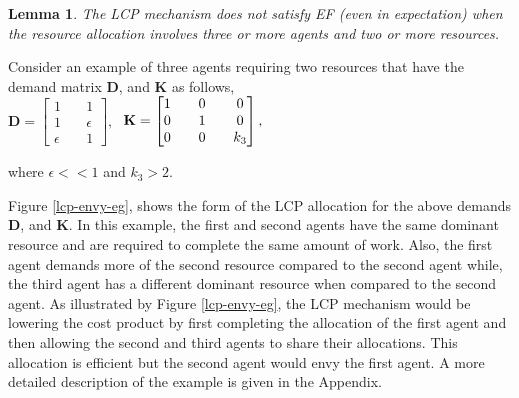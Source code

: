 \documentclass[letterpaper]{article} %
\newtheorem{lemma}{Lemma}
\theoremstyle{definition}
\begin{document}
\begin{lemma} \label{lcp-envy}
The LCP mechanism does not satisfy EF (even in expectation) when the resource allocation involves three or more agents and two or more resources.  
\end{lemma}


Consider an example of three agents requiring two resources that have the demand matrix $\mathbf{D}$, and $\mathbf{K}$ as follows, \\[2 pt]
\noindent $\mathbf{D} = \begin{bmatrix} 1 \quad & 1 \\
1 \quad & \epsilon \\
\epsilon \quad & 1\end{bmatrix} ,\;$ 
\noindent $\mathbf{K} = \begin{bmatrix} 1 \quad & 0 \quad & 0 \\
0 \quad & 1 \quad & 0 \\
0 \quad & 0 \quad & k_{3} \\\end{bmatrix}, \\$ 

\noindent where $\epsilon << 1$ and $k_{3} > 2$. 

Figure \ref{lcp-envy-eg}, shows the form of the LCP allocation for the above demands $\mathbf{D}$, and $\mathbf{K}$. In this example, the first and second agents have the same dominant resource and are required to complete the same amount of work. Also, the first agent demands more of the second resource compared to the second agent while, the third agent has a different dominant resource when compared to the second agent. As illustrated by Figure \ref{lcp-envy-eg}, the LCP mechanism would be lowering the cost product by first completing the allocation of the first agent and then allowing the second and third agents to share their allocations. This allocation is efficient but the second agent would envy the first agent. A more detailed description of the example is given in the Appendix.  
\end{document}
